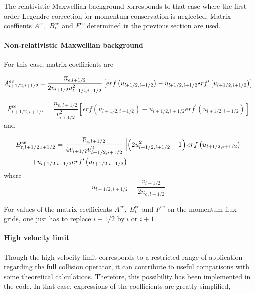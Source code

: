 The relativistic Maxwellian background corresponds to that case where the
first order Legendre correction for momentum conservation is neglected.
Matrix coeffients $A^{ee},$ $B_{t}^{ee}$ and $F^{ee}$ determined in the
previous section are used.

\paragraph{Non-relativistic Maxwellian background}

For this case, matrix coefficients are

\begin{equation}
A_{l+1/2,i+1/2}^{ee}=\frac{\overline{n}_{e,l+1/2}}{%
2v_{i+1/2}u_{l+1/2,i+1/2}^{2}}\left[ erf \left( u_{l+1/2,i+1/2}\right)
-u_{l+1/2,i+1/2}erf ^{\prime }\left( u_{l+1/2,i+1/2}\right) \right]
\end{equation}

\begin{equation}
F_{l+1/2,i+1/2}^{ee}=\frac{\overline{n}_{e,l+1/2}}{v_{i+1/2}^{2}}\left[ erf
\left( u_{l+1/2,i+1/2}\right) -u_{l+1/2,i+1/2}erf ^{\prime }\left(
u_{l+1/2,i+1/2}\right) \right]
\end{equation}
and

\begin{align}
&B_{t,l+1/2,i+1/2}^{ee}=\frac{\overline{n}_{e,l+1/2}}{%
4v_{i+1/2}u_{l+1/2,i+1/2}^{2}}\left[ \left(
2u_{l+1/2,i+1/2}^{2}-1\right) erf \left( u_{l+1/2,i+1/2}\right)
\right.\nonumber\\&\qquad\left.+u_{l+1/2,i+1/2}erf ^{\prime
}\left( u_{l+1/2,i+1/2}\right) \right]
\end{align}
where
\begin{equation}
u_{l+1/2,i+1/2}=\frac{v_{i+1/2}}{2\overline{n}_{e,l+1/2}}
\end{equation}

For values of the matrix coefficients $A^{ee},$ $B_{t}^{ee}$ and $F^{ee}$ on
the momentum flux grids, one just has to replace $i+1/2$ by $i$ or $i+1$.

\paragraph{High velocity limit}

Though the high velocity limit corresponds to a restricted range of
application regarding the full collision operator, it can contribute to
useful comparisons with some theoretical calculations. Therefore, this
possibility has been implemented in the code. In that case, expressions of
the coefficients are greatly simplified,

